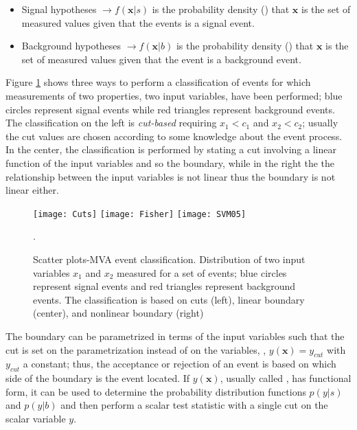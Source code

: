 \begin{itemize}
\item Signal hypotheses $\to f(\textbf{x}|s)$ is the probability density () that $\textbf{x}$ is the set of measured values given that the events is a signal event. 
\item Background hypotheses $ \to f(\textbf{x}|b)$ is the probability density () that $\textbf{x}$ is the set of measured values given that the event is a background event.
\end{itemize}

Figure \ref{fig:scatter_plot} shows three ways to perform a classification of events for which measurements of two properties, \ie two input variables, have been performed; blue circles represent signal events while red triangles represent background events. The classification on the left is \textit{cut-based} requiring $x_1<c_1$ and $x_2<c_2$; usually the cut values are chosen according to some knowledge about the event process. In the center, the classification is performed by stating a cut involving a linear function of the input variables and so the boundary, while in the right the the relationship between the input variables is not linear thus the boundary is not linear either.          

\begin{figure}[!h]
  \centering
  \texttt{[image: Cuts]}
  \texttt{[image: Fisher]}
  \texttt{[image: SVM05]}
  \caption[Scatter plots-MVA event classification.]{Scatter plots-MVA event classification. Distribution of two input variables $x_1$ and $x_2$ measured for a set of events; blue circles represent signal events and red triangles represent background events. The classification is based on cuts (left), linear boundary (center), and nonlinear boundary (right)\cite{mva}}\label{fig:scatter_plot}.
\end{figure}

The boundary can be parametrized in terms of the input variables such that the cut is set on the parametrization instead of on the variables, \ie, $y(\textbf{x})=y_{cut}$ with $y_{cut}$ a constant; thus, the acceptance or rejection of an event is based on which side of the boundary is the event located. If $y(\textbf{x})$, usually called , has functional form, it can be used to determine the probability distribution functions $p(y|s)$ and $p(y|b)$ and then perform a scalar test statistic with a single cut on the scalar variable $y$. 

